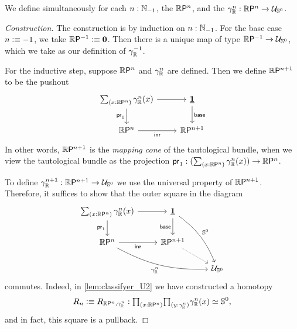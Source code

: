 \begin{defn}\label{defn:realprojective}
We define simultaneously for each $n:\N_{-1}$, 
the  $\rprojective{n}$, 
and the  $\tautfam[\R]{n}:\rprojective{n}\to \UU_{\sphere{0}}$.
\end{defn}

\begin{proof}[Construction]
The construction is by induction on $n:\N_{-1}$.
For the base case $n\defeq -1$, 
we take $\rprojective{-1}\defeq\emptyt$. 
Then there is a unique map of type $\rprojective{-1}\to \UU_{\sphere{0}}$, which we
take as our definition of $\tautfam[\R]{-1}$.

For the inductive step, suppose $\rprojective{n}$ and $\tautfam[\R]{n}$ are defined. Then we define $\rprojective{n+1}$ to be the pushout
\begin{equation*}
\begin{tikzcd}
{\sm{x:\rprojective{n}}\tautfam[\R]{n}(x)} \arrow[d,swap,"\proj 1"] \arrow[r] & \unit \arrow[d,"\base"] \\
\rprojective{n} \arrow[r,swap,"\inr"] & \rprojective{n+1}
\end{tikzcd}
\end{equation*}
In other words, 
$\rprojective{n+1}$ is the \emph{mapping cone} of the tautological bundle, 
when we view the tautological bundle as the projection 
$\proj 1:(\sm{x:\rprojective{n}}\tautfam[\R]{n}(x))\to\rprojective{n}$. 

To define $\tautfam[\R]{n+1}:\rprojective{n+1}\to \UU_{\sphere{0}}$
we use the universal property of $\rprojective{n+1}$. 
Therefore, it suffices to show that the outer square in the diagram
\begin{equation}\label{eq:diagram}
\begin{tikzcd}
{\sm{x:\rprojective{n}}\tautfam[\R]{n}(x)} \arrow[d,swap,"\proj 1"] \arrow[r] & \unit \arrow[d,swap,"\base"] \arrow[ddr,bend left=15,"\sphere{0}"]\\
\rprojective{n} \arrow[drr,bend right=15,swap,"{\tautfam[\R]{n}}"] \arrow[r,swap,"\inr"] & \rprojective{n+1} \arrow[dr,densely dotted] \\
& & \UU_{\sphere{0}}
\end{tikzcd}
\end{equation}
commutes. Indeed, in \autoref{lem:classifyer_U2} we have constructed a homotopy 
\begin{equation*}
R_n\defeq R_{\rprojective{n},\tautfam[\R]{n}}:\prd{x:\rprojective{n}}{y:\tautfam[\R]{n}} \eqv{\tautfam[\R]{n}(x)}{\sphere{0}},
\end{equation*}
and in fact, this square is a pullback.
\end{proof}

